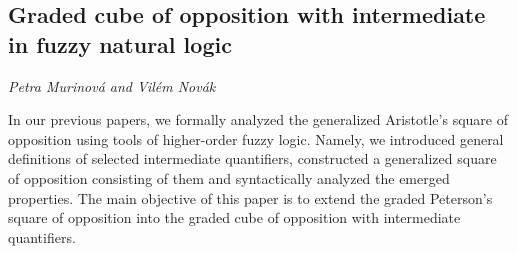 \documentclass[../booklet.tex]{subfiles}
\begin{document}
\subsection[Graded cube of opposition with intermediate in fuzzy natural logic. {\it Petra Murinová and Vilém Novák}]{Graded cube of opposition with intermediate in fuzzy natural logic}
 

\begin{center}
  {\it Petra Murinová and Vilém Novák}
\end{center}

\vskip 0.8cm


In our previous papers, we formally analyzed the generalized Aristotle's square of opposition using tools of higher-order fuzzy logic. Namely, we introduced general definitions of selected intermediate quantifiers, constructed a generalized square of opposition consisting of them and syntactically analyzed the emerged properties. The main objective of this paper is to extend the graded Peterson's square of opposition into the graded cube of opposition with intermediate quantifiers.

\end{document}
